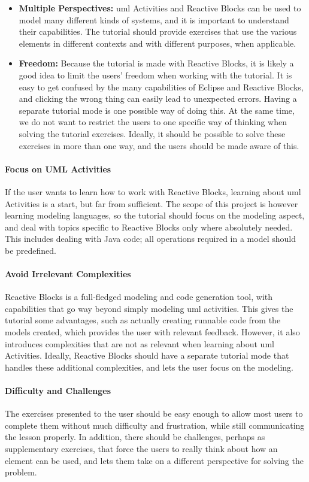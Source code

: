 \begin{itemize}
	\item{\textbf{Multiple Perspectives:}} \gls{uml} Activities and Reactive Blocks can be used to model many different kinds of systems, and it is important to understand their capabilities. The tutorial should provide exercises that use the various elements in different contexts and with different purposes, when applicable.
	\item{\textbf{Freedom:}} Because the tutorial is made with Reactive Blocks, it is likely a good idea to limit the users' freedom when working with the tutorial. It is easy to get confused by the many capabilities of Eclipse and Reactive Blocks, and clicking the wrong thing can easily lead to unexpected errors. Having a separate tutorial mode is one possible way of doing this. At the same time, we do not want to restrict the users to one specific way of thinking when solving the tutorial exercises. Ideally, it should be possible to solve these exercises in more than one way, and the users should be made aware of this.
\end{itemize}

\paragraph{Focus on UML Activities} If the user wants to learn how to work with Reactive Blocks, learning about \gls{uml} Activities is a start, but far from sufficient. The scope of this project is however learning modeling languages, so the tutorial should focus on the modeling aspect, and deal with topics specific to Reactive Blocks only where absolutely needed. This includes dealing with Java code; all operations required in a model should be predefined.

\paragraph{Avoid Irrelevant Complexities} Reactive Blocks is a full-fledged modeling and code generation tool, with capabilities that go way beyond simply modeling \gls{uml} activities. This gives the tutorial some advantages, such as actually creating runnable code from the models created, which provides the user with relevant feedback. However, it also introduces complexities that are not as relevant when learning about \gls{uml} Activities. Ideally, Reactive Blocks should have a separate tutorial mode that handles these additional complexities, and lets the user focus on the modeling.

\paragraph{Difficulty and Challenges} The exercises presented to the user should be easy enough to allow most users to complete them without much difficulty and frustration, while still communicating the lesson properly. In addition, there should be challenges, perhaps as supplementary exercises, that force the users to really think about how an element can be used, and lets them take on a different perspective for solving the problem.

